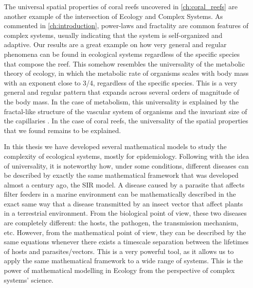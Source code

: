 The universal spatial properties of coral reefs uncovered in
\cref*{ch:coral_reefs} are another example of the intersection of Ecology and
Complex Systems. As commented in \cref{ch:introduction}, power-laws and
fractality are common features of complex systems, usually indicating that the
system is self-organized and adaptive. Our results are a great example on how
very general and regular phenomena can be found in ecological systems
regardless of the specific species that compose the reef. This somehow
resembles the universality of the metabolic theory of ecology, in which the
metabolic rate of organisms scales with body mass with an exponent close to
3/4, regardless of the specific species. This is a very general and regular
pattern that expands across several orders of magnitude of the body mass. In
the case of metabolism, this universality is explained by the fractal-like
structure of the vascular system of organisms and the invariant size of the
capillaries \cite{West1997}. In the case of coral reefs, the universality of
the spatial properties that we found remains to be explained.


In this thesis we have developed several mathematical models to study the
complexity of ecological systems, mostly for epidemiology. Following with the
idea of universality, it is noteworthy how, under some conditions, different
diseases can be described by exactly the same mathematical framework that was
developed almost a century ago, the SIR model. A disease caused by a parasite
that affects filter feeders in a marine environment can be mathematically
described in the exact same way that a disease transmitted by an insect vector
that affect plants in a terrestrial environment. From the biological point of
view, these two diseases are completely different: the hosts, the pathogen, the
transmission mechanism, etc. However, from the mathematical point of view,
they can be described by the same equations whenever there exists a timescale
separation between the lifetimes of hosts and parasites/vectors. This is a very
powerful tool, as it allows us to apply the same mathematical framework to a
wide range of systems. This is the power of mathematical modelling in Ecology
from the perspective of complex systems' science.

